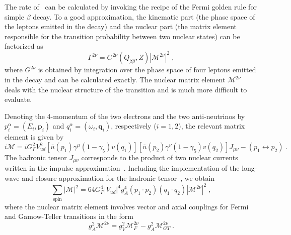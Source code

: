 The rate of \nnbb\ can be calculated by invoking the recipe of the Fermi
golden rule for simple $\beta$ decay. To a good approximation, the kinematic
part (the phase space of the leptons emitted in the decay) and the nuclear part
(the matrix element responsible for the transition probability between two
nuclear states) can be factorized as
\begin{equation}
  \Gamma^{2\nu} = G^{2\nu}(Q_{\beta\beta},Z) |\mathcal{M}^{2\nu}|^2 \;,
\end{equation}
where $G^{2\nu}$ is obtained by integration over the phase space of four
leptons emitted in the decay and can be calculated exactly. The nuclear matrix
element $\mathcal{M}^{2\nu}$ deals with the nuclear structure of the transition
and is much more difficult to evaluate.

Denoting the 4-momentum of the two electrons and the two anti-neutrinos by
$p^\alpha_i=(E_i,\mathbf{p}_i)$ and $q^\alpha_i=(\omega_i,\mathbf{q}_i)$,
respectively ($i=1,2$), the relevant matrix element is given by
\begin{equation}
  i\mathcal{M} = iG^2_F V^2_{ud} [\bar{u}(p_1) \gamma^\mu (1-\gamma_5) v(q_1)]
                 [\bar{u}(p_2) \gamma^\nu (1-\gamma_5) v(q_2)] J_{\mu\nu} -
                 (p_1\leftrightarrow p_2) \;.
\end{equation}
The hadronic tensor $J_{\mu\nu}$ corresponds to the product of two nuclear
currents written in the impulse approximation~\cite{Tomoda1991}. Including the
implementation of the long-wave and closure approximation for the hadronic
tensor~\cite{Tomoda1991}, we obtain
\begin{equation}
  \sum_\text{spin} |\mathcal{M}|^2 = 64 G^4_F |V_{ud}|^4 g^4_A (p_1 \cdot p_2)
                                     (q_1 \cdot q_2) |\mathcal{M}^{2\nu}|^2 \;,
\end{equation}
where the nuclear matrix element involves vector and axial couplings for Fermi
and Gamow-Teller transitions in the form
\begin{equation}
  g^2_A\mathcal{M}^{2\nu} = g^2_V \mathcal{M}^{2\nu}_F - g^2_A \mathcal{M}^{2\nu}_{GT} \;.
\end{equation}

